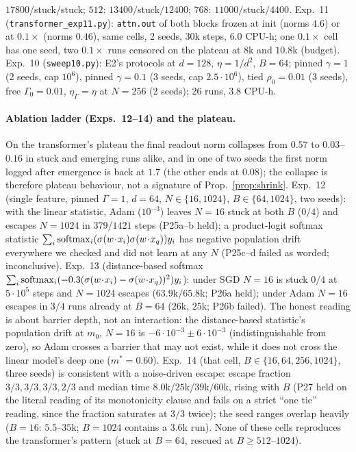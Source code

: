 $17800/$stuck$/$stuck; $512$: $13400/$stuck$/12400$; $768$: $11000/$stuck$/4400$. Exp.~11 (\texttt{transformer\_exp11.py}): \texttt{attn.out} of both blocks frozen at init (norms $4.6$) or at $0.1\times$ (norms $0.46$), same cells, 2 seeds, $30$k steps, $6.0$ CPU-h; one $0.1\times$ cell has one seed, two $0.1\times$ runs censored on the plateau at $8$k and $10.8$k (budget). Exp.~10 (\texttt{sweep10.py}): E2's protocols at $d=128$, $\eta=1/d^2$, $B=64$; pinned $\gamma{=}1$ (2 seeds, cap $10^6$), pinned $\gamma{=}0.1$ (3 seeds, cap $2.5\cdot10^6$), tied $\rho_0{=}0.01$ (3 seeds), free $\Gamma_0{=}0.01$, $\eta_\Gamma{=}\eta$ at $N{=}256$ (2 seeds); 26 runs, $3.8$ CPU-h.

\paragraph{Ablation ladder (Exps.~12--14) and the plateau.}\label{app:ladder}
On the transformer's plateau the final readout norm collapses from $0.57$ to $0.03$--$0.16$ in stuck and emerging runs alike, and in one of two seeds the
first norm logged after emergence is back at $1.7$ (the other ends at $0.08$); the collapse is therefore plateau behaviour, not a signature of
Prop.~\ref{prop:shrink}. Exp.~12 (single feature, pinned $\Gamma=1$, $d=64$, $N\in\{16,1024\}$, $B\in\{64,1024\}$, two seeds): with the linear statistic,
Adam ($10^{-3}$) leaves $N=16$ stuck at both $B$ ($0/4$) and escapes $N=1024$ in $379$/$1421$ steps (P25a--b held); a product-logit softmax statistic
$\sum_i\mathrm{softmax}_i(\sigma(w\!\cdot\!x_i)\sigma(w\!\cdot\!x_q))y_i$ has negative population drift everywhere we checked and did not learn at any $N$ (P25c--d
failed as worded; inconclusive). Exp.~13 (distance-based softmax $\sum_i\mathrm{softmax}_i(-0.3(\sigma(w\!\cdot\!x_i)-\sigma(w\!\cdot\!x_q))^2)y_i$): under SGD
$N=16$ is stuck $0/4$ at $5\cdot10^5$ steps and $N=1024$ escapes ($63.9$k$/65.8$k; P26a held); under Adam $N=16$ escapes in $3/4$ runs already at $B=64$
($26$k, $25$k; P26b failed). The honest reading is about barrier depth, not an interaction: the distance-based statistic's population drift at $m_0$,
$N=16$ is $-6\cdot10^{-3}\pm6\cdot10^{-3}$ (indistinguishable from zero), so Adam crosses a barrier that may not exist, while it does not cross the linear
model's deep one ($m^*=0.60$). Exp.~14 (that cell, $B\in\{16,64,256,1024\}$, three seeds) is consistent with a noise-driven escape: escape fraction
$3/3,3/3,3/3,2/3$ and median time $8.0$k$/25$k$/39$k$/60$k, rising with $B$ (P27 held on the literal reading of its monotonicity clause and fails on a strict
``one tie'' reading, since the fraction saturates at $3/3$ twice); the seed ranges overlap heavily ($B=16$: $5.5$--$35$k; $B=1024$ contains a $3.6$k run).
None of these cells reproduces the transformer's pattern (stuck at $B=64$, rescued at $B\ge512$--$1024$).

